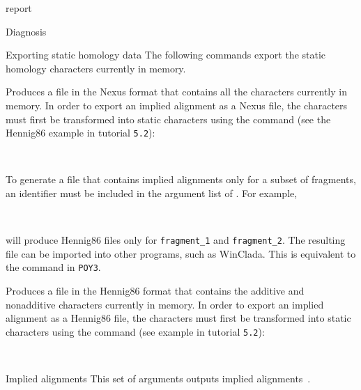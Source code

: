 \begin{command}{report}{}
\begin{arguments}
\begin{argumentgroup}{Diagnosis}
\end{argumentgroup} 

\begin{argumentgroup}{Exporting static homology data}
{The following commands export the static homology characters
currently in memory.}

{Produces a file in the Nexus format that contains all the
characters currently in memory. In
order to export an implied alignment as a Nexus file, the
characters must first be transformed into static characters
using the  command (see the Hennig86 
example in tutorial \texttt{5.2}): 
\begin{flushleft}
 \\
\end{flushleft}}
{}

\begin{statement}
To generate a file that contains implied
alignments only for a subset of fragments, an identifier must be
included in the argument list of . For
example, 
\begin{flushleft}
 \\
\end{flushleft}
will produce Hennig86 files only for
\texttt{fragment\_1} and \texttt {fragment\_2}. The resulting file can 
be imported into other programs,
such as WinClada. This is equivalent to the
 command in \texttt{POY3}.
\end{statement}


{Produces a file in the Hennig86 format that contains the
additive and nonadditive characters currently in memory. In
order to export an implied alignment as a Hennig86 file, the
characters must first be transformed into static characters
using the  command (see example in tutorial \texttt{5.2}): 
\begin{flushleft}
 \\
\end{flushleft}}
{}

\end{argumentgroup}

\begin{argumentgroup}{Implied alignments}
{This set of arguments outputs implied alignments~\cite{wheeler2003}.} 


\end{argumentgroup}
\end{arguments}
\end{command}
